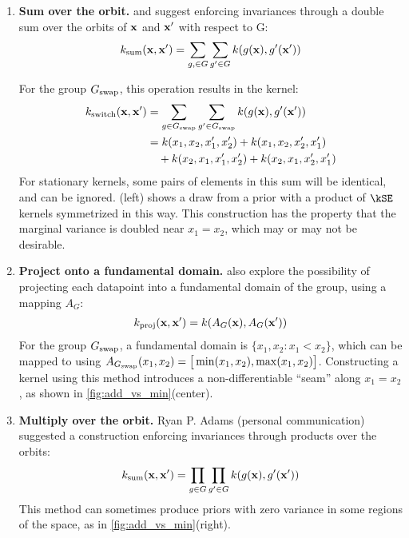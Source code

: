 %
\begin{enumerate}

\item {\bf Sum over the orbit.} 
\citet{ginsbourger2012argumentwise} and \citet{kondor2008group} suggest enforcing invariances through a double sum over the orbits of ${\bf{x}}$ and ${\bf{x}}'$ with respect to G:
%
\begin{align}
k_\textnormal{sum}({\bf{x}}, {\bf{x}}') = \sum_{g, \in G} \sum_{g' \in G} k( g( {\bf{x}} ), g'( {\bf{x}}') )
\end{align}

For the group $G_\textnormal{swap}$, this operation results in the kernel:
%
\begin{align}
k_\textnormal{switch}({\bf{x}}, {\bf{x}}')
& = \sum_{g \in G_\textnormal{swap}} \sum_{g' \in G_\textnormal{swap}} k( g( {\bf{x}} ), g'( {\bf{x}}') ) \\
& = k(x_1, x_2, x_1', x_2') + k(x_1, x_2, x_2', x_1')  \nonumber \\ 
& \quad + k(x_2, x_1, x_1', x_2') + k(x_2, x_1, x_2', x_1')
\end{align}
%
For stationary kernels, some pairs of elements in this sum will be identical, and can be ignored.
(left) shows a draw from a \gp{} prior with a product of $\kSE$ kernels symmetrized in this way.
This construction has the property that the marginal variance is doubled near $x_1 = x_2$, which may or may not be desirable.



\item {\bf Project onto a fundamental domain.}
\citet{Invariances13} also explore the possibility of projecting each datapoint into a fundamental domain of the group, using a mapping $A_G$:
%
\begin{align}
k_\textnormal{proj}({\bf{x}}, {\bf{x}}') = k( A_G({\bf{x}}), A_G( {\bf{x}}') )
\end{align}
%
For the group $G_\textnormal{swap}$, a fundamental domain is $\{x_1, x_2 : x_1 < x_2\}$, which can be mapped to using $A_{G_\textnormal{swap}}( x_1, x_2 ) = \big[ \min(x_1, x_2), \max(x_1, x_2) \big]$.
Constructing a kernel using this method introduces a non-differentiable  ``seam'' along $x_1 = x_2$, as shown in \cref{fig:add_vs_min}(center).

\item {\bf Multiply over the orbit.}
Ryan P. Adams (personal communication) suggested a construction enforcing invariances through products over the orbits:
%
\begin{align}
k_\textnormal{sum}({\bf{x}}, {\bf{x}}') = \prod_{g \in G} \prod_{g' \in G} k( g( {\bf{x}} ), g'( {\bf{x}}') )
\end{align}
%
This method can sometimes produce \gp{} priors with zero variance in some regions of the space, as in \cref{fig:add_vs_min}(right).
\end{enumerate}
